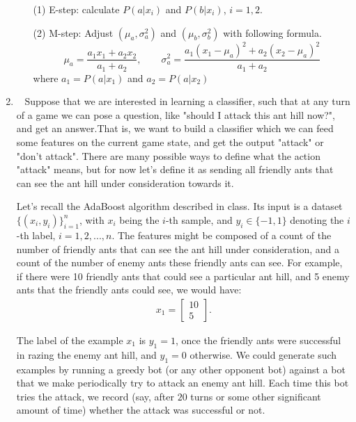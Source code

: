 \documentclass[10pt]{article}
\begin{document}
\begin{enumerate}
            \begin{enumerate}
                \item[(1)] E-step: calculate $P(a|x_i)$ and $P(b|x_i)$, $i = 1, 2$.\\
                \item[(2)] M-step: Adjust $(\mu_a, \sigma_a^2)$ and $(\mu_b, \sigma_b^2)$ with following formula. \\
                $$\mu_a = \frac{a_1x_1 + a_2x_2}{a_1 + a_2}, \qquad \sigma_a^2 = \frac{a_1(x_1-\mu_a)^2 + a_2(x_2-\mu_a)^2}{a_1 + a_2}$$
                where $a_1 = P(a|x_1)$ and $a_2 = P(a|x_2)$\\
            \end{enumerate}
            \newpage

	    \item ~
        Suppose that we are interested in learning a classifier, such that at any turn of a game we can pose a question, like "should I attack this ant hill now?", and get an answer.That is, we want to build a classifier which we can feed some features on the current game state, and get the output "attack" or "don't attack". There are many possible ways to define what the action "attack" means, but for now let's define it as sending all friendly ants that can see the ant hill under consideration towards it.

	    Let’s recall the AdaBoost algorithm described in class. Its input is a dataset $\{(x_{i},y_{i})\}_{i=1}^{n}$, with $x_i$ being the $i$-th sample, and $y_{i}\in \{-1,1\}$ denoting the $i$-th label, $i=1,2,...,n$. The features might be composed of a count of the number of friendly ants that can see the ant hill under consideration, and a count of the number of enemy ants these friendly ants can see. For example, if there were 10 friendly ants that could see a particular ant hill, and 5 enemy ants that the friendly ants could see, we would have:
	    \begin{align*}
		    x_1 = \begin{bmatrix}
			10 \\
			5
		    \end{bmatrix}.
	    \end{align*}

	    The label of the example $x_{1}$ is $y_{1} = 1$, once the friendly ants were successful in razing the enemy ant hill, and $y_{1} = 0$ otherwise. We could generate such examples by running a greedy bot (or any other opponent bot) against a bot that we make periodically try to attack an enemy ant hill. Each time this bot tries the attack, we record (say, after $20$ turns or some other significant amount of time) whether the attack was successful or not.


\end{enumerate}
\end{document}
